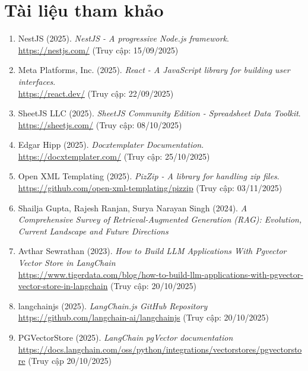 \section{Tài liệu tham khảo}

\begin{enumerate}
    \item NestJS (2025). \textit{NestJS - A progressive Node.js framework}. \\
    \url{https://nestjs.com/} (Truy cập: 15/09/2025)
    
    \item Meta Platforms, Inc. (2025). \textit{React - A JavaScript library for building user interfaces}. \\
    \url{https://react.dev/} (Truy cập: 22/09/2025)
    
    \item SheetJS LLC (2025). \textit{SheetJS Community Edition - Spreadsheet Data Toolkit}. \\
    \url{https://sheetjs.com/} (Truy cập: 08/10/2025)
    
    \item Edgar Hipp (2025). \textit{Docxtemplater Documentation}. \\
    \url{https://docxtemplater.com/} (Truy cập: 25/10/2025)
    
    \item Open XML Templating (2025). \textit{PizZip - A library for handling zip files}. \\
    \url{https://github.com/open-xml-templating/pizzip} (Truy cập: 03/11/2025)

    \item  Shailja Gupta, Rajesh Ranjan, Surya Narayan Singh (2024). \textit{A Comprehensive Survey of Retrieval-Augmented Generation (RAG): Evolution, Current Landscape and Future Directions}

    \item Avthar Sewrathan (2023). \textit{How to Build LLM Applications With Pgvector Vector Store in LangChain} \\
    \url{https://www.tigerdata.com/blog/how-to-build-llm-applications-with-pgvector-vector-store-in-langchain} (Truy cập: 20/10/2025)

    \item langchainjs (2025). \textit{LangChain.js GitHub Repository} \\
    \url{https://github.com/langchain-ai/langchainjs} (Truy cập: 20/10/2025)

    \item PGVectorStore (2025). \textit{LangChain pgVector documentation}\\
    \url{https://docs.langchain.com/oss/python/integrations/vectorstores/pgvectorstore} (Truy cập 20/10/2025)
\end{enumerate}
